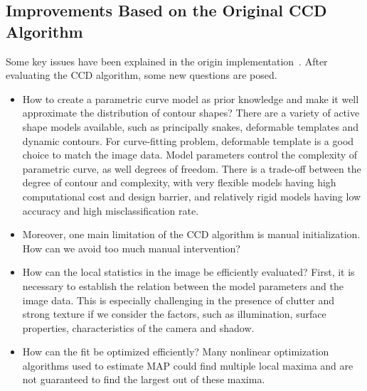 

\subsection{Improvements Based on the Original CCD Algorithm}
\label{sec:prob}
Some key issues have been explained in the origin
implementation~\cite{hanek2004contracting}.
After evaluating the CCD algorithm, some new questions are posed.

\begin{itemize}
\item How to create a parametric curve model as prior knowledge and
  make it well approximate the distribution of contour shapes? 
There are a variety of active shape models available, such as principally snakes,
  deformable templates and dynamic contours. For curve-fitting
  problem, deformable template is a good choice to match the image
  data. Model parameters control the complexity of parametric curve,
  as well degrees of freedom. There is a trade-off between the degree
  of contour and complexity, with very flexible models having high
  computational cost and design barrier, and relatively rigid models
  having low accuracy and high misclassification rate. 

\item Moreover, one
  main limitation of the CCD algorithm is manual initialization. How can
  we avoid too much manual intervention?

\item How can the local statistics in the image be efficiently
  evaluated? First, it is necessary to establish the relation between the model parameters
  and the image data. This is especially challenging in the presence
  of clutter and strong texture if we consider the factors, such as
  illumination, surface properties, characteristics of the camera and
  shadow. 

\item How can the fit be optimized efficiently? Many
  nonlinear optimization algorithms used to estimate MAP could find
  multiple local maxima and  are not guaranteed to find the largest
  out of these maxima.
\end{itemize}

